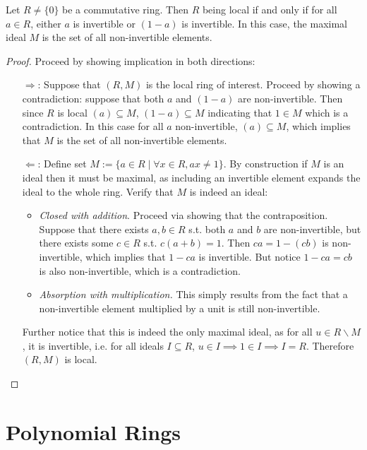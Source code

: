 \begin{proposition}
    Let $R\neq \{0\}$ be a commutative ring. Then $R$ being local if and only if for all $a\in R$, either $a$ is invertible or $(1-a)$ is invertible. In this case, the maximal ideal $M$ is the set of all non-invertible elements. 
\end{proposition}

\begin{proof}
    Proceed by showing implication in both directions:
    \begin{itemize}
        \item[$\Rightarrow$:] Suppose that $(R, M)$ is the local ring of interest. Proceed by showing a contradiction: suppose that both $a$ and $(1-a)$ are non-invertible. Then since $R$ is local $(a) \subseteq M$, $(1-a) \subseteq M$ indicating that $1\in M$ which is a contradiction. In this case for all $a$ non-invertible, $(a) \subseteq M$, which implies that $M$ is the set of all non-invertible elements. 
        \item[$\Leftarrow$:] Define set $M := \{ a\in R \mid \forall x\in R, ax \neq 1 \}$. By construction if $M$ is an ideal then it must be maximal, as including an invertible element expands the ideal to the whole ring. Verify that $M$ is indeed an ideal:
            \begin{itemize}
                \item \emph{Closed with addition}. Proceed via showing that the contraposition. Suppose that there exists $a, b\in R$ s.t. both $a$ and $b$ are non-invertible, but there exists some $c\in R$ s.t. $c(a + b) = 1$. Then $ca = 1 - (cb)$ is non-invertible, which implies that $1 - ca$ is invertible. But notice $1 - ca = cb$ is also non-invertible, which is a contradiction.
                \item \emph{Absorption with multiplication.} This simply results from the fact that a non-invertible element multiplied by a unit is still non-invertible. 
            \end{itemize}

        Further notice that this is indeed the only maximal ideal, as for all $u\in R\smallsetminus M$, it is invertible, i.e. for all ideals $I\subseteq R$, $u\in I\implies 1\in I \implies I = R$. Therefore $(R, M)$ is local. 
    \end{itemize}
\end{proof}

\section{Polynomial Rings}

